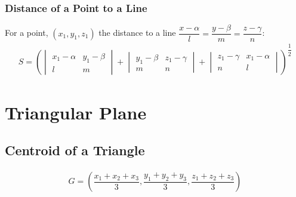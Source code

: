 \documentclass[../main.tex]{subfile}
\begin{document}
    \subsubsection{Distance of a Point to a Line}
    For a point, $(x_1,y_1,z_1)$ the distance to a line $\dfrac{x-\alpha}{l}=\dfrac{y-\beta}{m}=\dfrac{z-\gamma}{n}$:
    \begin{align}
    S = \left(
        \begin{vmatrix}
        x_1-\alpha & y_1-\beta\\
        l & m
        \end{vmatrix} + 
        \begin{vmatrix}
        y_1-\beta & z_1-\gamma\\
        m & n
        \end{vmatrix}+
        \begin{vmatrix}
        z_1-\gamma & x_1-\alpha\\
        n & l
        \end{vmatrix}
        \right)^{\dfrac{1}{2}}
    \end{align}

    \section{Triangular Plane}
    \subsection{Centroid of a Triangle}
    \begin{align}
        G=\left(\dfrac{x_1+x_2+x_3}{3},\dfrac{y_1+y_2+y_3}{3},\dfrac{z_1+z_2+z_3}{3}\right)
    \end{align}
\end{document}
